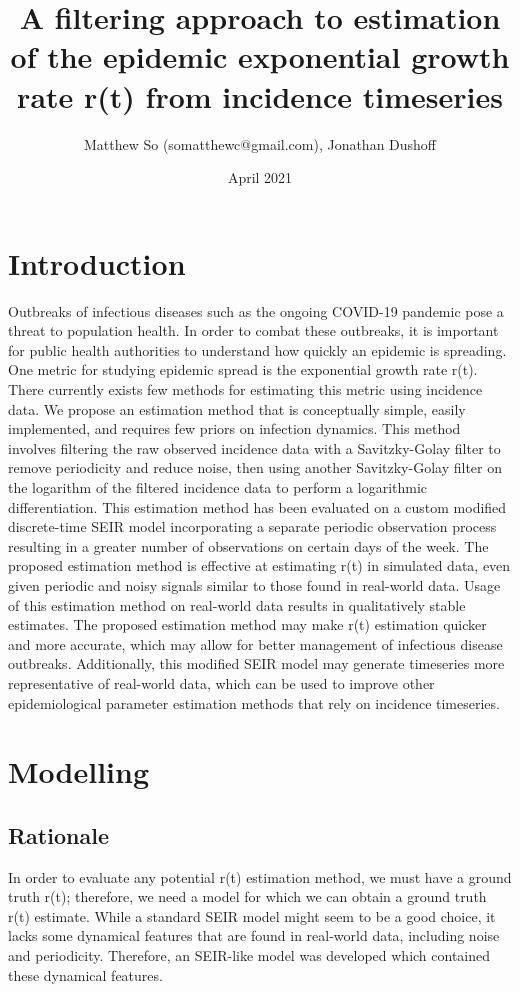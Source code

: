 \documentclass{article}
\title{A filtering approach to estimation of the epidemic exponential growth rate r(t) from incidence timeseries}
\author{Matthew So (somatthewc@gmail.com), Jonathan Dushoff}
\date{April 2021}
\begin{document}
\maketitle
\tableofcontents

\section{Introduction}
Outbreaks of infectious diseases such as the ongoing COVID-19 pandemic pose a threat to population health. In order to combat these outbreaks, it is important for public health authorities to understand how quickly an epidemic is spreading. One metric for studying epidemic spread is the exponential growth rate r(t). There currently exists few methods for estimating this metric using incidence data. We propose an estimation method that is conceptually simple,  easily implemented, and requires few priors on infection dynamics. This method involves filtering the raw observed incidence data with a Savitzky-Golay filter to remove periodicity and reduce noise, then using another Savitzky-Golay filter on the logarithm of the filtered incidence data to perform a logarithmic differentiation. This estimation method has been evaluated on a custom modified discrete-time SEIR model incorporating a separate periodic observation process resulting in a greater number of observations on certain days of the week. The proposed estimation method is effective at estimating r(t) in simulated data, even given periodic and noisy signals similar to those found in real-world data. Usage of this estimation method on real-world data results in qualitatively stable estimates. The proposed estimation method may make r(t) estimation quicker and more accurate, which may allow for better management of infectious disease outbreaks. Additionally, this modified SEIR model may generate timeseries more representative of real-world data, which can be used to improve other epidemiological parameter estimation methods that rely on incidence timeseries.

\section{Modelling}

\subsection{Rationale}
In order to evaluate any potential r(t) estimation method, we must have a ground truth r(t); therefore, we need a model for which we can obtain a ground truth r(t) estimate. While a standard SEIR model might seem to be a good choice, it lacks some dynamical features that are found in real-world data, including noise and periodicity. Therefore, an SEIR-like model was developed which contained these dynamical features. 
\end{document}
